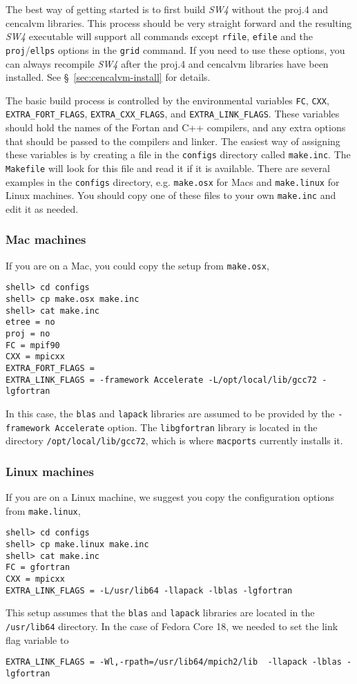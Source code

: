 \documentclass[11pt]{article}
\begin{document}
The best way of getting started is to first build \emph{SW4} without the proj.4 and cencalvm
libraries. This process should be very straight forward and the resulting \emph{SW4} executable
will support all commands except \verb+rfile+, \verb+efile+ and the \verb+proj+/\verb+ellps+ options in the
\verb+grid+ command. If you need to use these options, you can always recompile \emph{SW4} after the
proj.4 and cencalvm libraries have been installed. See \S~\ref{sec:cencalvm-install} for details.

The basic build process is controlled by the environmental variables \verb+FC+, \verb+CXX+,
\verb+EXTRA_FORT_FLAGS+, \verb+EXTRA_CXX_FLAGS+, and \verb+EXTRA_LINK_FLAGS+. These variables should
hold the names of the Fortan and C++ compilers, and any extra options that should be passed to
the compilers and linker. The easiest way of assigning these variables is by creating a file in the
\verb+configs+ directory called \verb+make.inc+. The \verb+Makefile+ will look for this file and
read it if it is available. There are several examples in the \verb+configs+ directory, e.g.
\verb+make.osx+ for Macs and \verb+make.linux+ for Linux machines. You should copy one of these files
to your own \verb+make.inc+ and edit it as needed. 

\subsubsection{Mac machines}
If you are on a Mac, you could copy the setup from \verb+make.osx+,
\begin{verbatim}
shell> cd configs
shell> cp make.osx make.inc
shell> cat make.inc
etree = no
proj = no
FC = mpif90
CXX = mpicxx
EXTRA_FORT_FLAGS = 
EXTRA_LINK_FLAGS = -framework Accelerate -L/opt/local/lib/gcc72 -lgfortran
\end{verbatim}
In this case, the \verb+blas+ and \verb+lapack+ libraries are assumed to be provided by the
\verb+-framework Accelerate+ option. The \verb+libgfortran+ library is located in the directory
\verb+/opt/local/lib/gcc72+, which is where \verb+macports+ currently installs it.

\subsubsection{Linux machines}
If you are on a Linux machine, we suggest you copy the configuration options from \verb+make.linux+,
\begin{verbatim}
shell> cd configs
shell> cp make.linux make.inc
shell> cat make.inc
FC = gfortran
CXX = mpicxx
EXTRA_LINK_FLAGS = -L/usr/lib64 -llapack -lblas -lgfortran
\end{verbatim}
This setup assumes that the \verb+blas+ and \verb+lapack+ libraries are located in the
\verb+/usr/lib64+ directory. 
In the case of Fedora Core 18, we needed to set the link flag variable to
\begin{verbatim}
EXTRA_LINK_FLAGS = -Wl,-rpath=/usr/lib64/mpich2/lib  -llapack -lblas -lgfortran
\end{verbatim}
\end{document}
